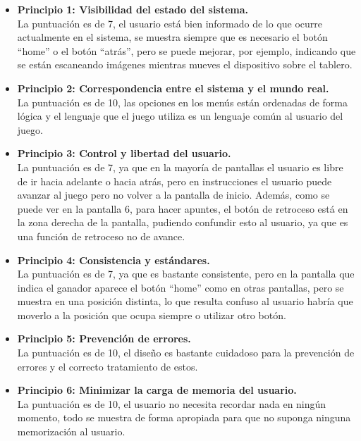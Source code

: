 \begin{itemize}
  \item \textbf{Principio 1: Visibilidad del estado del sistema.}\\
  La puntuación es de 7, el usuario está bien informado de lo que ocurre actualmente en el sistema, se muestra siempre que es necesario el botón “home” o el botón “atrás”, pero se puede mejorar, por ejemplo, indicando que se están escaneando imágenes mientras mueves el dispositivo sobre el tablero.

  \item \textbf{Principio 2: Correspondencia entre el sistema y el mundo real.}\\
  La puntuación es de 10, las opciones en los menús están ordenadas de forma lógica y el lenguaje que el juego utiliza es un lenguaje común al usuario del juego.

  \item \textbf{Principio 3: Control y libertad del usuario.}\\
  La puntuación es de 7, ya que en la mayoría de pantallas el usuario es libre de ir hacia adelante o hacia atrás, pero en instrucciones el usuario puede avanzar al juego pero no volver a la pantalla de inicio. Además, como se puede ver en la pantalla 6, para hacer apuntes, el botón de retroceso está en la zona derecha de la pantalla, pudiendo confundir esto al usuario, ya que es una función de retroceso no de avance.

  \item \textbf{Principio 4: Consistencia y estándares.}\\
  La puntuación es de 7, ya que es bastante consistente, pero en la pantalla que indica el ganador aparece el botón “home” como en otras pantallas, pero se muestra en una posición distinta, lo que resulta confuso al usuario habría que moverlo a la posición que ocupa siempre o utilizar otro botón.

  \item \textbf{Principio 5: Prevención de errores.}\\
  La puntuación es de 10, el diseño es bastante cuidadoso para la prevención de errores y el correcto tratamiento de estos.

  \item \textbf{Principio 6: Minimizar la carga de memoria del usuario.}\\
  La puntuación es de 10, el usuario no necesita recordar nada en ningún momento, todo se muestra de forma apropiada para que no suponga ninguna memorización al usuario.


\end{itemize}
